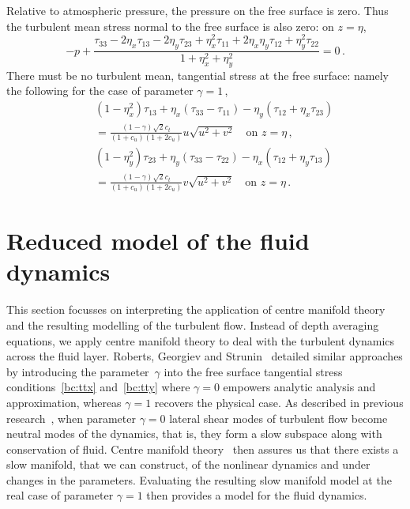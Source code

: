 \documentclass[a5paper,12pt]{article}
\begin{document}
Relative to atmospheric pressure, the pressure on the free surface is zero. 
Thus the turbulent mean stress normal to the free surface is also zero: on $z=\eta$,
\begin{equation}
    -p+\frac{\tau_{33} -2\eta_x\tau_{13} -2\eta_y\tau_{23}
    +\eta_x^2\tau_{11} +2\eta_x\eta_y\tau_{12}+\eta_y^2\tau_{22}}
    {1+\eta_x^2+\eta_y^2}
     =0\,.
    \label{bc:ttz}
\end{equation}
There must be no turbulent mean, tangential stress at the free surface: namely the following for the case of parameter $\gamma=1$\,,
\begin{eqnarray}&&
    (1-\eta_x^2)\tau_{13}+\eta_x(\tau_{33}-\tau_{11})
    -\eta_y(\tau_{12}+\eta_x\tau_{23})
    \nonumber\\&&{}
    = \frac{(1-\gamma)\sqrt2c_t}{(1+c_u)(1+2c_u)} u\sqrt{u^2+v^2}
    \quad\text{on } z=\eta\,,
    \label{bc:ttx}
    \\&&
    (1-\eta_y^2)\tau_{23}+\eta_y(\tau_{33}-\tau_{22})
    -\eta_x(\tau_{12}+\eta_y\tau_{13})
    \nonumber\\&&{}
    = \frac{(1-\gamma)\sqrt2c_t}{(1+c_u)(1+2c_u)} v\sqrt{u^2+v^2}
    \quad\text{on } z=\eta\,.
    \label{bc:tty}
\end{eqnarray}


\section{Reduced model of the fluid dynamics}

This section focusses on interpreting the application of centre manifold theory and the resulting modelling of the turbulent flow.
Instead of depth averaging equations, we apply centre manifold theory to deal with the turbulent dynamics across the fluid layer. 
Roberts, Georgiev and Strunin~\cite{Roberts2008, Georgiev2008} detailed similar approaches by introducing the parameter~$\gamma$ into the free surface tangential stress conditions~\eqref{bc:ttx} and~\eqref{bc:tty} where $\gamma=0$ empowers analytic analysis and approximation, whereas $\gamma=1$ recovers the physical case. 
As described in previous research~\cite{Roberts2008, Georgiev2008}, when parameter \(\gamma=0\) lateral shear modes of turbulent flow become neutral modes of the dynamics, that is, they form a slow subspace along with conservation of fluid.
Centre manifold theory~\cite[e.g.]{Vanderbauwhede88} then assures us that there exists a slow manifold, that we can construct, of the nonlinear dynamics and under changes in the parameters.
Evaluating the resulting slow manifold model at the real case of parameter \(\gamma=1\) then provides a model for the fluid dynamics.
 
\end{document}
